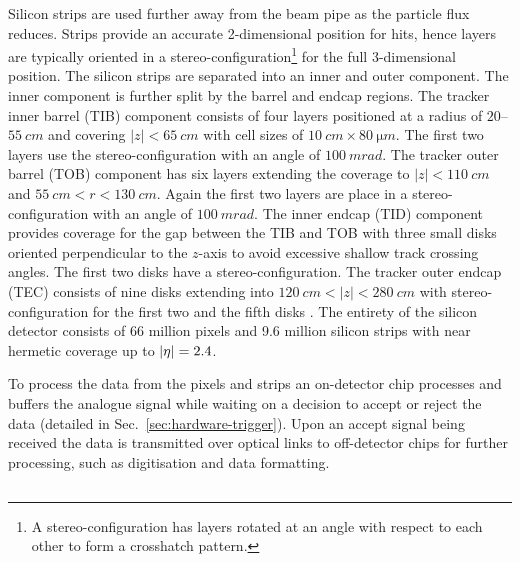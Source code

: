 Silicon strips are used further away from the beam pipe as the particle flux
reduces. Strips provide an accurate 2-dimensional position for hits, hence
layers are typically oriented in a stereo-configuration\footnote{A
stereo-configuration has layers rotated at an angle with respect to each other
to form a crosshatch pattern.} for the full 3-dimensional position. The
silicon strips are separated into an inner and outer component. The inner
component is further split by the barrel and endcap regions. The tracker inner
barrel (TIB) component consists of four layers positioned at a radius of
$20$--${\SI{55}{cm}}$ and covering ${|z|<\SI{65}{cm}}$ with cell sizes of
${\SI{10}{cm}\times\SI{80}{\micro m}}$. The first two layers use the
stereo-configuration with an angle of ${\SI{100}{mrad}}$. The tracker outer
barrel (TOB) component has six layers extending the coverage to
${|z|<\SI{110}{cm}}$ and ${\SI{55}{cm}<r<\SI{130}{cm}}$. Again the first two 
layers are place in a stereo-configuration with an angle of
${\SI{100}{mrad}}$. The inner endcap (TID) component provides coverage for the
gap between the TIB and TOB with three small disks oriented perpendicular to
the $z$-axis to avoid excessive shallow track crossing angles. The first two
disks have a stereo-configuration. The tracker outer endcap (TEC) consists of
nine disks extending into ${\SI{120}{cm}<|z|<\SI{280}{cm}}$ with
stereo-configuration for the first two  and the fifth disks
\cite{Borrello:687861}. The entirety of the silicon detector consists of 66
million pixels and 9.6 million silicon strips with near hermetic coverage up
to $|\eta|=2.4$.

To process the data from the pixels and strips an on-detector chip processes
and buffers the analogue signal while waiting on a decision to accept or
reject the data (detailed in Sec.~\ref{sec:hardware-trigger}). Upon an accept
signal being received the data is transmitted over optical links to
off-detector chips for further processing, such as digitisation and data
formatting.


\subsection{\ECAL}

